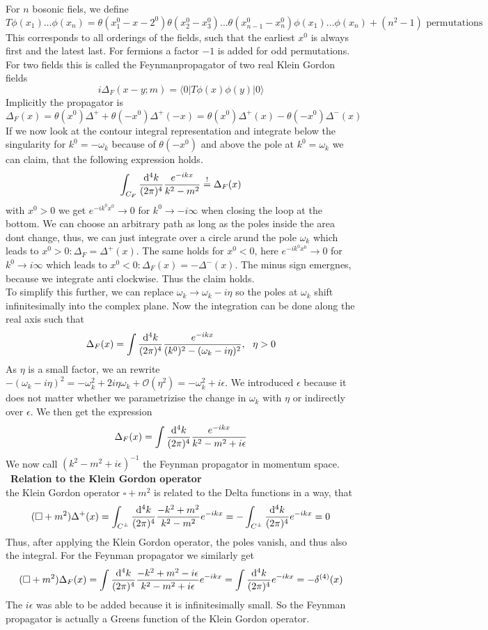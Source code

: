 \documentclass{include/thesisclass}
\newcommand{\rk}{\rangle}
\newcommand{\lk}{\langle}
\newcommand{\df}{\rightarrow}
\newcommand{\dd}{{\rm d}}
\newcommand{\OO}{\mathcal{O}}
\newcommand{\soll}{\overset{!}{=}}
\newcommand{\eps}{\epsilon}
\newcommand{\sub}[1]{~\newline\newline\textbf{#1}\\}
\begin{document}
For $n$ bosonic fiels, we define
\[ T \phi(x_1)\ldots \phi(x_n) = \theta(x_1^0-x-2^0)\theta(x_2^0-x_3^0)\ldots \theta(x_{n-1}^0-x_n^0) \phi(x_1)\ldots \phi(x_n) + (n^2-1)\textrm{~permutations}\]
This corresponds to all orderings of the fields, such that the earliest $x^0$ is always first and the latest last.
For fermions a factor $-1$ is added for odd permutations.
For two fields this is called the Feynmanpropagator of two real Klein Gordon fields
\[ i \Delta_F(x-y;m) = \lk 0 | T \phi(x) \phi(y) | 0 \rk\]
Implicitly the propagator is
\[ \Delta_F(x) = \theta(x^0) \Delta^+ + \theta(-x^0)\Delta^+(-x) = \theta(x^0) \Delta^+(x) - \theta(-x^0) \Delta^-(x)\]
If we now look at the contour integral representation and integrate below the singularity for $k^0 = -\omega_k$ because of $\theta(-x^0)$ and above the pole at $k^0 = \omega_k$ we can claim, that the following expression holds.
\[ \int_{C_F} \frac{ \dd^4 k}{(2\pi)^4} \frac{ e^{-ikx}}{k^2-m^2} \soll \Delta_F(x)\]
with $x^0 > 0$ we get $e^{-ik^0x^0} \df 0$ for $k^0 \df -i\infty$ when closing the loop at the bottom. 
We can choose an arbitrary path as long as the poles inside the area dont change, thus, we can just integrate over a circle arund the pole $\omega_k$ which leads to $x^0 > 0: \Delta_F = \Delta^+(x)$.
The same holds for $x^0 < 0$, here $e^{-ik^0x^0} \df 0$ for $k^0 \df i \infty$ which leads to $x^0 < 0: \Delta_F(x) = - \Delta^-(x)$. 
The minus sign emergnes, because we integrate anti clockwise.
Thus the claim holds.\\
To simplify this further, we can replace $\omega_k \df \omega_k - i \eta$ so the poles at $\omega_k$ shift infinitesimally into the complex plane.
Now the integration can be done along the real axis such that
\[ \Delta_F(x) = \int \frac{ \dd^4 k}{(2\pi)^4} \frac{ e^{-ikx}}{(k^0)^2 - ( \omega_k - i \eta)^2}, ~~\eta > 0\]
As $\eta$ is a small factor, we an rewrite $-(\omega_k-i\eta)^2 = -\omega_k^2 + 2 i \eta\omega_k + \OO(\eta^2) = - \omega_k^2  +i \eps$. We introduced $\eps$ because it does not matter whether we parametrizise the change in $\omega_k$ with $\eta$ or indirectly over $\eps$.
We then get the expression
\[ \Delta_F(x) = \int \frac{\dd ^4 k}{(2\pi)^4} \frac{ e^{-ikx}}{k^2 - m^2 + i \eps}\]
We now call $(k^2 - m^2 + i \eps)^{-1}$ the Feynman propagator in momentum space.
\sub{Relation to the Klein Gordon operator}
the Klein Gordon operator $\square + m^2$ is related to the Delta functions in a way, that
\[ (\square +m^2) \Delta^+(x) = \int_{C^\pm} \frac{\dd^4 k}{(2\pi)^4} \frac{ -k^2 + m^2}{k^2 - m^2} e^{-ikx} = - \int_{C^\pm} \frac{\dd^4 k}{(2\pi)^4} e^{-ikx} = 0\]
Thus, after applying the Klein Gordon operator, the poles vanish, and thus also the integral.
For the Feynman propagator we similarly get
\[ ( \square + m^2) \Delta_F(x) = \int \frac{\dd ^4 k}{(2\pi)^4}\frac{-k^2 + m^2 -i\eps}{k^2-m^2+i\eps} e^{-ikx}  = \int \frac{\dd^4 k}{(2\pi)^4} e^{-ikx} = - \delta^{(4)}(x)\]
The $i\eps$ was able to be added because it is infinitesimally small. 
So the Feynman propagator is actually a Greens function of the Klein Gordon operator.
\end{document}
